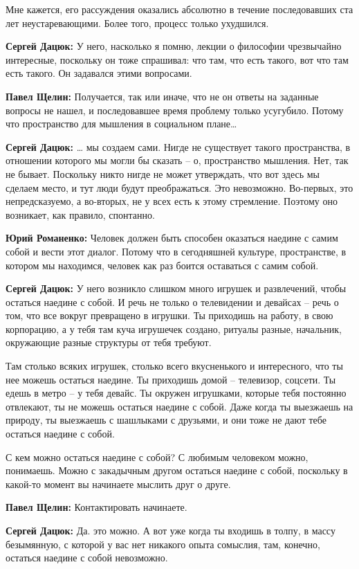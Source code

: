 Мне кажется, его рассуждения оказались абсолютно в течение последовавших ста
лет неустаревающими. Более того, процесс только ухудшился.

\textbf{Сергей Дацюк:} У него, насколько я помню, лекции о философии чрезвычайно
интересные, поскольку он тоже спрашивал: что там, что есть такого, вот что там
есть такого. Он задавался этими вопросами.

\textbf{Павел Щелин:} Получается, так или иначе, что не он ответы на заданные вопросы не
нашел, и последовавшее время проблему только усугубило. Потому что пространство
для мышления в социальном плане…

\textbf{Сергей Дацюк:} … мы создаем сами. Нигде не существует такого пространства, в
отношении которого мы могли бы сказать – о, пространство мышления. Нет, так не
бывает. Поскольку никто нигде не может утверждать, что вот здесь мы сделаем
место, и тут люди будут преображаться. Это невозможно. Во-первых, это
непредсказуемо, а во-вторых, не у всех есть к этому стремление. Поэтому оно
возникает, как правило, спонтанно.

\textbf{Юрий Романенко:} Человек должен быть способен оказаться наедине с самим собой и
вести этот диалог. Потому что в сегодняшней культуре, пространстве, в котором
мы находимся, человек как раз боится оставаться с самим собой.

\textbf{Сергей Дацюк:} У него возникло слишком много игрушек и развлечений, чтобы
остаться наедине с собой. И речь не только о телевидении и девайсах – речь о
том, что все вокруг превращено в игрушки. Ты приходишь на работу, в свою
корпорацию, а у тебя там куча игрушечек создано, ритуалы разные, начальник,
окружающие разные структуры от тебя требуют.

Там столько всяких игрушек, столько всего вкусненького и интересного, что ты
нее можешь остаться наедине. Ты приходишь домой – телевизор, соцсети. Ты едешь
в метро – у тебя девайс. Ты окружен игрушками, которые тебя постоянно
отвлекают, ты не можешь остаться наедине с собой. Даже когда ты выезжаешь на
природу, ты выезжаешь с шашлыками с друзьями, и они тоже не дают тебе остаться
наедине с собой.

С кем можно остаться наедине с собой? С любимым человеком можно, понимаешь.
Можно с закадычным другом остаться наедине с собой, поскольку в какой-то момент
вы начинаете мыслить друг о друге.

\textbf{Павел Щелин:} Контактировать начинаете.

\textbf{Сергей Дацюк:} Да. это можно. А вот уже когда ты входишь в толпу, в массу
безымянную, с которой у вас нет никакого опыта сомыслия, там, конечно, остаться
наедине с собой невозможно.

